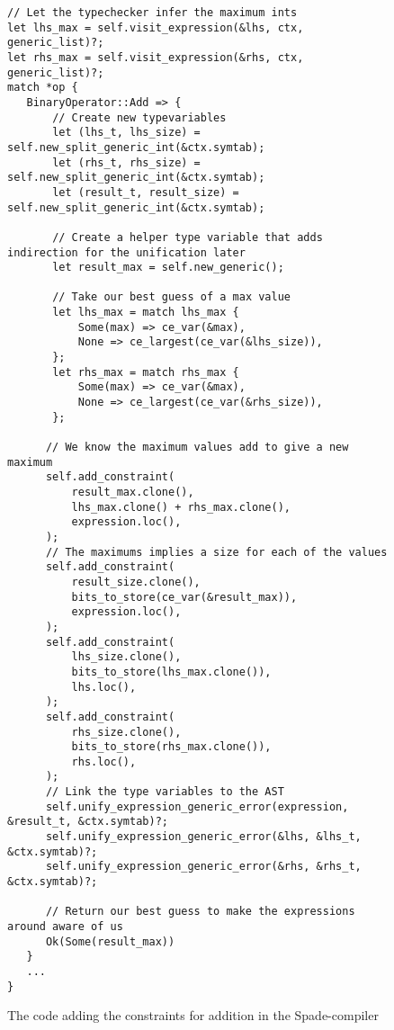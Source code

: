 \documentclass[msc,lith,english]{liuthesis}
\begin{document}
\begin{figure}
\begin{verbatim}
// Let the typechecker infer the maximum ints 
let lhs_max = self.visit_expression(&lhs, ctx, generic_list)?;
let rhs_max = self.visit_expression(&rhs, ctx, generic_list)?;
match *op {
   BinaryOperator::Add => {
       // Create new typevariables
       let (lhs_t, lhs_size) = self.new_split_generic_int(&ctx.symtab);
       let (rhs_t, rhs_size) = self.new_split_generic_int(&ctx.symtab);
       let (result_t, result_size) = self.new_split_generic_int(&ctx.symtab);

       // Create a helper type variable that adds indirection for the unification later
       let result_max = self.new_generic();

       // Take our best guess of a max value
       let lhs_max = match lhs_max {
           Some(max) => ce_var(&max),
           None => ce_largest(ce_var(&lhs_size)),
       };
       let rhs_max = match rhs_max {
           Some(max) => ce_var(&max),
           None => ce_largest(ce_var(&rhs_size)),
       };

      // We know the maximum values add to give a new maximum
      self.add_constraint(
          result_max.clone(),
          lhs_max.clone() + rhs_max.clone(),
          expression.loc(),
      );
      // The maximums implies a size for each of the values
      self.add_constraint(
          result_size.clone(),
          bits_to_store(ce_var(&result_max)),
          expression.loc(),
      );
      self.add_constraint(
          lhs_size.clone(),
          bits_to_store(lhs_max.clone()),
          lhs.loc(),
      );
      self.add_constraint(
          rhs_size.clone(),
          bits_to_store(rhs_max.clone()),
          rhs.loc(),
      );
      // Link the type variables to the AST
      self.unify_expression_generic_error(expression, &result_t, &ctx.symtab)?;
      self.unify_expression_generic_error(&lhs, &lhs_t, &ctx.symtab)?;
      self.unify_expression_generic_error(&rhs, &rhs_t, &ctx.symtab)?;

      // Return our best guess to make the expressions around aware of us
      Ok(Some(result_max))
   }
   ...
}
\end{verbatim}
\caption{The code adding the constraints for addition in the Spade-compiler}
\label{fig:BinaryExpression}
\end{figure}
\end{document}
